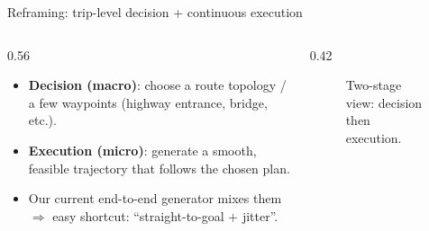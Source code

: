 \documentclass[aspectratio=169]{beamer}
\begin{document}
\begin{frame}{Reframing: trip-level decision + continuous execution}
\begin{columns}[T,onlytextwidth]
  \begin{column}{0.56\linewidth}
    \begin{itemize}
      \item \textbf{Decision (macro)}: choose a route topology / a few waypoints (highway entrance, bridge, etc.).
      \item \textbf{Execution (micro)}: generate a smooth, feasible trajectory that follows the chosen plan.
      \item Our current end-to-end generator mixes them $\Rightarrow$ easy shortcut: ``straight-to-goal + jitter''.
    \end{itemize}
  \end{column}
  \begin{column}{0.42\linewidth}
    \begin{figure}
      \centering
      \caption*{\scriptsize Two-stage view: decision then execution.}
    \end{figure}
  \end{column}
\end{columns}
\end{frame}
\end{document}
